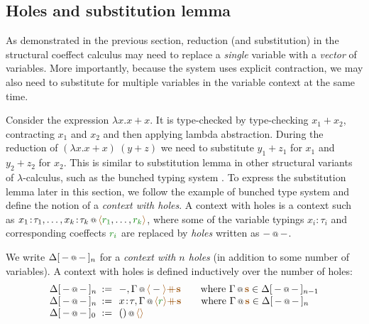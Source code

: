 \subsection{Holes and substitution lemma}
\label{sec:struct-syntactic-subst}

As demonstrated in the previous section, reduction (and substitution) in the structural coeffect
calculus may need to replace a \emph{single} variable with a \emph{vector} of variables.
More importantly, because the system uses explicit contraction, we may also need to substitute
for multiple variables in the variable context at the same time.

Consider the expression $\lambda x.x+x$. It is type-checked by type-checking $x_1 + x_2$,
contracting $x_1$ and $x_2$ and then applying lambda abstraction. During the reduction of
$(\lambda x.x+x)~(y+z)$ we need to substitute $y_1+z_1$ for $x_1$ and $y_2+z_2$ for $x_2$.
This is similar to substitution lemma in other structural variants of $\lambda$-calculus,
such as the bunched typing system \cite{substruct-bunched}. To express the substitution
lemma later in this section, we follow the example of bunched type system and define the
notion of a \emph{context with holes}. A context with holes is a context such as
$\coctx{x_1\!:\!\tau_1, \ldots, x_k\!:\!\tau_k}{\alift{\cclrd{r_1}, \ldots, \cclrd{r_k}}}$,
where some of the variable typings $x_i\!:\!\tau_i$ and corresponding coeffects $\cclrd{r_i}$
are replaced by \emph{holes} written as $\coctx{-}{-}$.

\begin{definition}
We write $\Delta[\,\coctx{-}{-}\,]_n$ for a \emph{context with $n$ holes} (in addition to some
number of variables). A context with holes is defined inductively over the number of holes:
%
\begin{equation*}
\begin{array}{lcl}
 \Delta[\,\coctx{-}{-}\,]_n &\narrow{:=}&
   \coctx{-, \Gamma}{\alift{-} \atimes \aclrd{\textbf{s}} }
   \qquad \textnormal{where}~\coctx{\Gamma}{\aclrd{\textbf{s}}} \in \Delta[\,\coctx{-}{-}\,]_{n-1} \\
 \Delta[\,\coctx{-}{-}\,]_n &\narrow{:=}&
   \coctx{x\!:\!\tau, \Gamma}{\alift{\cclrd{r}} \atimes \aclrd{\textbf{s}} }
   \qquad \textnormal{where}~\coctx{\Gamma}{\aclrd{\textbf{s}}} \in \Delta[\,\coctx{-}{-}\,]_n \\
 \Delta[\,\coctx{-}{-}\,]_0 &\narrow{:=}&
   \coctx{()}{\alift{}}
\end{array}
\end{equation*}
\end{definition}


